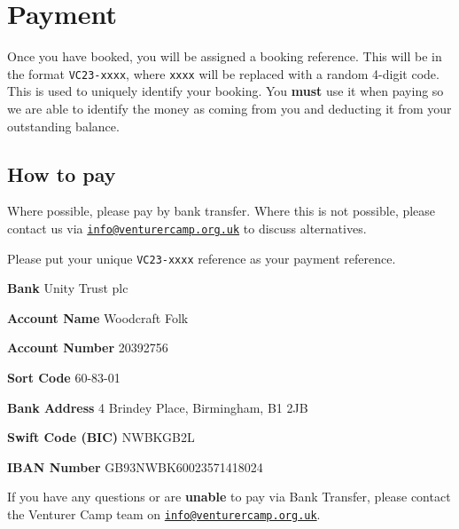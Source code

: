 \chapter{Payment}
\label{chap:payment}

Once you have booked, you will be assigned a booking reference. This will be in the format \verb|VC23-xxxx|, where \verb|xxxx| will be replaced with a random 4-digit code. This is used to uniquely identify your booking. You \textbf{must} use it when paying so we are able to identify the money as coming from you and deducting it from your outstanding balance.

\section{How to pay}
Where possible, please pay by bank transfer. Where this is not possible, please contact us via \href{mailto:info@venturercamp.org.uk}{\texttt{info@venturercamp.org.uk}} to discuss alternatives.

Please put your unique \verb|VC23-xxxx| reference as your  payment reference.

\textbf{Bank} Unity Trust plc

\textbf{Account Name} Woodcraft Folk  

\textbf{Account Number} 20392756   

\textbf{Sort Code}  60-83-01  

\textbf{Bank Address} 4 Brindey Place, Birmingham, B1 2JB  

\textbf{Swift Code (BIC)} NWBKGB2L  

\textbf{IBAN Number} GB93NWBK60023571418024  

If you have any questions or are \textbf{unable} to pay via Bank Transfer, please contact the Venturer Camp team on \href{mailto:info@venturercamp.org.uk}{\texttt{info@venturercamp.org.uk}}.  